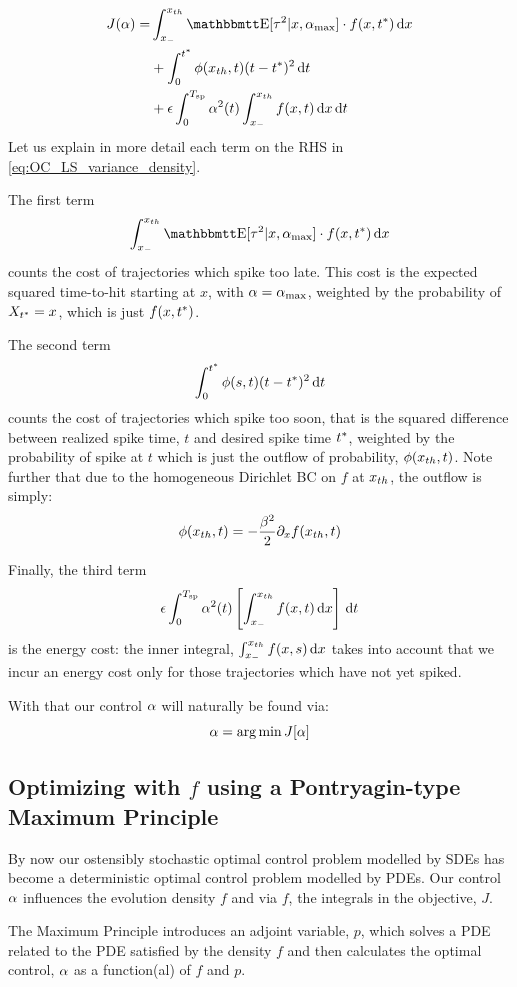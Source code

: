 \documentclass{article}
\begin{document}
\begin{align}
J(\a) =& 
\int_\xmin^\xth \Exp[\t^2|x, \amax] \cdot f(x,\T) \intd{x}
\notag
\\
&+ \int_0^\T \phi(\xth, t) (t-\T)^2 \intd{t}
\notag
\\
&+  \e \int_0^\ts  \a^2(t)  \int_\xmin^\xth f(x,t) \intd{x} \intd{t}
\label{eq:OC_LS_variance_density}
\end{align}
Let us explain in more detail each term on the RHS in
\cref{eq:OC_LS_variance_density}.

The first term $$ \int_\xmin^\xth \Exp[\t^2|x, \amax] \cdot f(x,\T) \intd{x} $$
counts the cost of trajectories which spike too late. This cost is the expected
squared time-to-hit starting at $x$, with  ${\alpha} = { {\alpha}_{\textrm{max}} }$, weighted by the
probability of $X_{ t^* } = x$, which is just $f(x,{ t^* })$.

The second term
$$
\int_0^{ t^* } \phi(s,t) (t-{ t^* })^2 \, \mathrm{d} t
$$
counts the cost of trajectories which spike too soon, that
is the squared difference between realized spike time, $t$ and desired spike
time ${ t^* }$, weighted by the probability of spike at $t$ which is just the outflow of
probability, $\phi({ x_{th} },t)$. Note further that due to the homogeneous
Dirichlet BC on $f$ at ${ x_{th} }$, the outflow is simply:
$$
\phi({ x_{th} }, t) = -\frac{{\beta}^2 }{2} {\partial}_x f({ x_{th} }, t) 
$$

Finally, the third term
$$
{\epsilon} \int_0^{ T_{\textrm{sp} } }  {\alpha}^2(t)  \left[  \int_{ x_{-} }^{ x_{th} } f(x,t) \, \mathrm{d} x \right] \, \mathrm{d} t
$$
is the energy cost: the inner integral, $\int_{ x_{-} }^{ x_{th} } f(x,s) \, \mathrm{d} x$
takes into account that we incur an energy cost only for those trajectories
which have not yet spiked.

With that our control ${\alpha}$ will naturally be found via:
$$
\a = \argmin J[\a]
$$

\subsection{Optimizing with $f$ using a Pontryagin-type Maximum Principle}
\label{sec:PDE_max_principle_for_pdf}
By now our ostensibly stochastic optimal control problem modelled by SDEs
has become a deterministic optimal control problem modelled by PDEs. Our control
${\alpha}$ influences the evolution density $f$ and via $f$, the integrals in the
objective, $J$.

The Maximum Principle introduces an adjoint variable, $p$, which solves a PDE
related to the PDE satisfied by the density $f$ and then calculates the optimal
control, ${\alpha}$ as a function(al) of $f$ and $p$.
\end{document}
